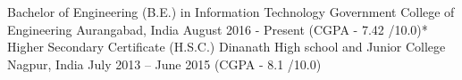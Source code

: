

\begin{cventries}

\cventry
    {Bachelor of Engineering (B.E.) in Information Technology} %
    {Government College of Engineering} %
    {Aurangabad, India} %
    {August 2016 - Present} %
    {(CGPA - 7.42 /10.0)*} 
\vspace{1em}
\cventry
    {Higher Secondary Certificate (H.S.C.)} %
    {Dinanath High school and Junior College} %
    {Nagpur, India} %
    {July 2013 – June 2015}%
    {(CGPA - 8.1 /10.0)}   
\end{cventries}
